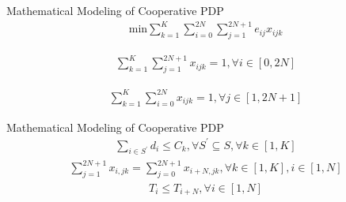 \documentclass{beamer}
\begin{document}
\begin{frame}{Mathematical Modeling of Cooperative PDP}
	\centering
	\begin{align}
		\mathrm{min} \sum_{k=1}^{K}\sum_{i=0}^{2N}\sum_{j=1}^{2N+1}e_{ij}x_{ijk}
	\end{align}

	\begin{align}
		\sum_{k=1}^{K}\sum_{j=1}^{2N+1}x_{ijk}=1,\forall i\in[0,2N]
	\end{align}

	\begin{align}
		\sum_{k=1}^{K}\sum_{i=0}^{2N}x_{ijk}=1,\forall j\in[1,2N+1]
	\end{align}
\end{frame}

\begin{frame}{Mathematical Modeling of Cooperative PDP}
	\begin{align}
		\sum_{i\in S^{\prime}}d_{i}\leq C_{k},\forall S^{\prime}\subseteq S,\forall k\in[1,K]
	\end{align}
	\begin{align}
		\sum_{j=1}^{2N+1}x_{i,jk}=\sum_{j=0}^{2N+1}x_{i+N,jk},\forall k\in[1,K],i\in[1,N]
	\end{align}
	\begin{align}
		T_{i}\leq T_{i+N},\forall i\in[1,N]
	\end{align}

\end{frame}
\end{document}
